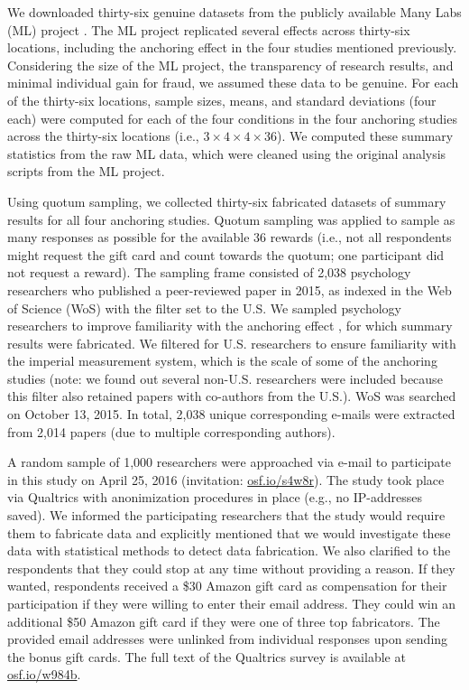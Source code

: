 \documentclass{article}
\begin{document}
We downloaded thirty-six genuine datasets from the publicly available Many Labs (ML) project \citep[\url{osf.io/pqf9r};][]{klein2014}. The ML project replicated several effects across thirty-six locations, including the anchoring effect in the four studies mentioned previously. Considering the size of the ML project, the transparency of research results, and minimal individual gain for fraud, we assumed these data to be genuine. For each of the thirty-six locations, sample sizes, means, and standard deviations (four each) were computed for each of the four conditions in the four anchoring studies across the thirty-six locations (i.e., $3\times4\times4\times36$). We computed these summary statistics from the raw ML data, which were cleaned using the original analysis scripts from the ML project.

Using quotum sampling, we collected thirty-six fabricated datasets of summary results for all four anchoring studies. Quotum sampling was applied to sample as many responses as possible for the available 36 rewards (i.e., not all respondents might request the gift card and count towards the quotum; one participant did not request a reward). The sampling frame consisted of 2,038 psychology researchers who published a peer-reviewed paper in 2015, as indexed in the Web of Science (WoS) with the filter set to the U.S. We sampled psychology researchers to improve familiarity with the anchoring effect \citep{jacowitz1995,tversky1974}, for which summary results were fabricated. We filtered for U.S. researchers to ensure familiarity with the imperial measurement system, which is the scale of some of the anchoring studies (note: we found out several non-U.S. researchers were included because this filter also retained papers with co-authors from the U.S.). WoS was searched on October 13, 2015. In total, 2,038 unique corresponding e-mails were extracted from 2,014 papers (due to multiple corresponding authors).

A random sample of 1,000 researchers were approached via e-mail to participate in this study on April 25, 2016 (invitation: \url{osf.io/s4w8r}). The study took place via Qualtrics with anonimization procedures in place (e.g., no IP-addresses saved). We informed the participating researchers that the study would require them to fabricate data and explicitly mentioned that we would investigate these data with statistical methods to detect data fabrication. We also clarified to the  respondents that they could stop at any time without providing a reason. If they wanted, respondents received a \$30 Amazon gift card as compensation for their participation if they were willing to enter their email address. They could win an additional \$50 Amazon gift card if they were one of three top fabricators. The provided email addresses were unlinked from individual responses upon sending the bonus gift cards. The full text of the Qualtrics survey is available at \url{osf.io/w984b}.
\end{document}
